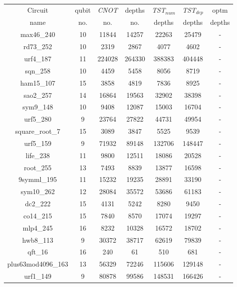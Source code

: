\documentclass[runningheads]{llncs}
\begin{document}
								\begin{table}[H]
									\begin{center}  
									\begin{tabular}{|c|c|c|c|c|c|c|}
									\hline
									Circuit &  qubit  & \textit{CNOT} &depths &\textit{TST$_{num}$}& \textit{TST$_{dep}$}  & optm 	  	\\
									 name	&   no. 	&	no. & no. & depths&  depths &  depths 	\\
									\hline
									max46\_240 & 10 & 11844 & 14257 & 22263 & 25479 & - \\
									rd73\_252 & 10 & 2319 & 2867 & 4077 & 4602 & - \\
									urf4\_187 & 11 & 224028 & 264330 & 388383 & 404448 & - \\
									sqn\_258 & 10 & 4459 & 5458 & 8056 & 8719 & - \\
									ham15\_107 & 15 & 3858 & 4819 & 7836 & 8925 & - \\
									sao2\_257 & 14 & 16864 & 19563 & 32902 & 38398 & - \\
									sym9\_148 & 10 & 9408 & 12087 & 15003 & 16704 & - \\
									urf5\_280 & 9 & 23764 & 27822 & 44731 & 49954 & - \\
									square\_root\_7 & 15 & 3089 & 3847 & 5525 & 9539 & - \\
									urf5\_159 & 9 & 71932 & 89148 & 132706 & 148447 & - \\
									life\_238 & 11 & 9800 & 12511 & 18086 & 20528 & - \\
									root\_255 & 13 & 7493 & 8839 & 13877 & 16598 & - \\
									9symml\_195 & 11 & 15232 & 19235 & 28891 & 33190 & - \\
									sym10\_262 & 12 & 28084 & 35572 & 53686 & 61183 & - \\
									dc2\_222 & 15 & 4131 & 5242 & 8280 & 9450 & - \\
									co14\_215 & 15 & 7840 & 8570 & 17074 & 19297 & - \\
									mlp4\_245 & 16 & 8232 & 10328 & 16572 & 18702 & - \\
									hwb8\_113 & 9 & 30372 & 38717 & 62619 & 79839 & - \\
									qft\_16 & 16 & 240 & 61 & 510 & 681 & - \\
									plus63mod4096\_163 & 13 & 56329 & 72246 & 115606 & 129148 & - \\
									urf1\_149 & 9 & 80878 & 99586 & 148531 & 166426 & - \\

\end{tabular}
\end{center}
\end{table}
\end{document}
